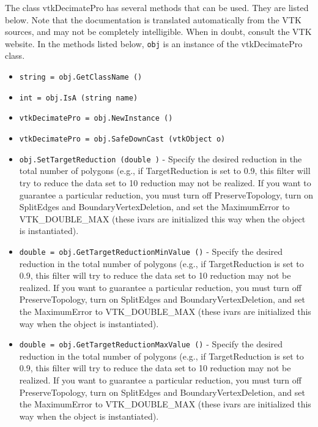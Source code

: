 The class vtkDecimatePro has several methods that can be used.
  They are listed below.
Note that the documentation is translated automatically from the VTK sources,
and may not be completely intelligible.  When in doubt, consult the VTK website.
In the methods listed below, \verb|obj| is an instance of the vtkDecimatePro class.
\begin{itemize}
\item  \verb|string = obj.GetClassName ()|

\item  \verb|int = obj.IsA (string name)|

\item  \verb|vtkDecimatePro = obj.NewInstance ()|

\item  \verb|vtkDecimatePro = obj.SafeDownCast (vtkObject o)|

\item  \verb|obj.SetTargetReduction (double )| -  Specify the desired reduction in the total number of polygons (e.g., if
 TargetReduction is set to 0.9, this filter will try to reduce the data set
 to 10%
 reduction may not be realized. If you want to guarantee a particular
 reduction, you must turn off PreserveTopology, turn on SplitEdges and
 BoundaryVertexDeletion, and set the MaximumError to VTK\_DOUBLE\_MAX (these
 ivars are initialized this way when the object is instantiated).

\item  \verb|double = obj.GetTargetReductionMinValue ()| -  Specify the desired reduction in the total number of polygons (e.g., if
 TargetReduction is set to 0.9, this filter will try to reduce the data set
 to 10%
 reduction may not be realized. If you want to guarantee a particular
 reduction, you must turn off PreserveTopology, turn on SplitEdges and
 BoundaryVertexDeletion, and set the MaximumError to VTK\_DOUBLE\_MAX (these
 ivars are initialized this way when the object is instantiated).

\item  \verb|double = obj.GetTargetReductionMaxValue ()| -  Specify the desired reduction in the total number of polygons (e.g., if
 TargetReduction is set to 0.9, this filter will try to reduce the data set
 to 10%
 reduction may not be realized. If you want to guarantee a particular
 reduction, you must turn off PreserveTopology, turn on SplitEdges and
 BoundaryVertexDeletion, and set the MaximumError to VTK\_DOUBLE\_MAX (these
 ivars are initialized this way when the object is instantiated).


\end{itemize}
